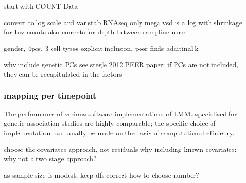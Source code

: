 start with COUNT Data

convert to log scale and var stab
RNAseq only
mega
vsd is a log with shrinkage for low counts
also corrects for depth between sampline norm

gender, 4pcs, 3 cell types
explicit inclusion, peer finds additinal k

why include genetic PCs
see stegle 2012 PEER paper: if PCs are not included, they can be recapitulated in the factors

\subsubsection{ mapping per timepoint}


The performance of various software implementations of \glspl{LMM} specialised for genetic association studies are highly comparable; the specific choice of implementation can usually be made on the basis of computational efficiency\autocite{eu-ahsunthornwattana2014ComparisonMethodsAccount}.

choose the covariates approach, not residuals
    why including known covariates: why not a two stage approach?

    as sample size is modest, keep dfs correct
    how to choose number?

